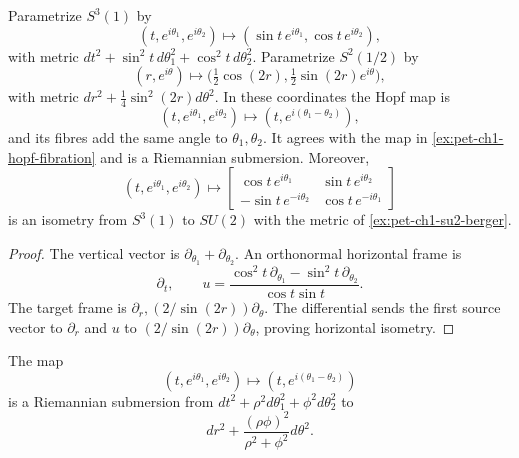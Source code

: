 \begin{example}
  \label{ex:pet-ch1-hopf-revisited}


  Parametrize $S^3(1)$ by
  \[
    (t,e^{i\theta_1},e^{i\theta_2})
      \longmapsto(\sin t\,e^{i\theta_1},\cos t\,e^{i\theta_2}),
  \]
  with metric
  $dt^2+\sin^2t\,d\theta_1^2+\cos^2t\,d\theta_2^2$. Parametrize
  $S^2(1/2)$ by
  \[
    (r,e^{i\theta})\longmapsto
      \big(\tfrac12\cos(2r),\tfrac12\sin(2r)e^{i\theta}\big),
  \]
  with metric $dr^2+\tfrac14\sin^2(2r)d\theta^2$. In these coordinates the
  Hopf map is
  \[
    (t,e^{i\theta_1},e^{i\theta_2})
      \longmapsto(t,e^{i(\theta_1-\theta_2)}),
  \]
  and its fibres add the same angle to $\theta_1,\theta_2$. It agrees with the
  map in \cref{ex:pet-ch1-hopf-fibration} and is a Riemannian submersion.
  Moreover,
  \[
    (t,e^{i\theta_1},e^{i\theta_2})\longmapsto
    \left[\begin{smallmatrix}
      \cos t\,e^{i\theta_1}&\sin t\,e^{i\theta_2}\\
      -\sin t\,e^{-i\theta_2}&\cos t\,e^{-i\theta_1}
    \end{smallmatrix}\right]
  \]
  is an isometry from $S^3(1)$ to $SU(2)$ with the metric of
  \cref{ex:pet-ch1-su2-berger}.
\end{example}
\begin{proof}

  \sketch
  The vertical vector is $\partial_{\theta_1}+\partial_{\theta_2}$. An
  orthonormal horizontal frame is
  \[
    \partial_t,\qquad
    u=\frac{\cos^2t\,\partial_{\theta_1}
              -\sin^2t\,\partial_{\theta_2}}{\cos t\sin t}.
  \]
  The target frame is
  $\partial_r,(2/\sin(2r))\partial_\theta$. The differential sends the first
  source vector to $\partial_r$ and $u$ to
  $(2/\sin(2r))\partial_\theta$, proving horizontal isometry.
\end{proof}

\begin{example}
  \label{ex:pet-ch1-hopf-general-submersion}


  The map
  \[
    (t,e^{i\theta_1},e^{i\theta_2})
      \longmapsto(t,e^{i(\theta_1-\theta_2)})
  \]
  is a Riemannian submersion from
  $dt^2+\rho^2d\theta_1^2+\phi^2d\theta_2^2$ to
  \[
    dr^2+\frac{(\rho\phi)^2}{\rho^2+\phi^2}d\theta^2.
  \]
\end{example}

